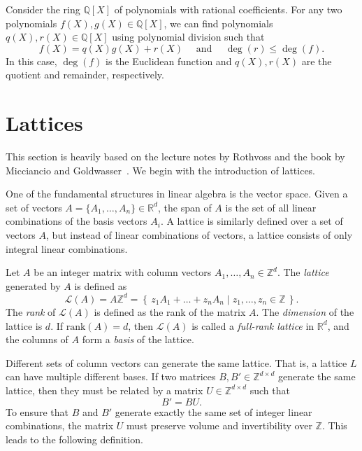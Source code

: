 \begin{example}
  Consider the ring $ℚ[X]$ of polynomials with rational coefficients.
  For any two polynomials $f(X), g(X) ∈ ℚ[X]$,
  we can find polynomials $q(X), r(X) ∈ ℚ[X]$
  using polynomial division such that
  \[
    f(X) = q(X) g(X) + r(X)
    \quad
    \text{ and }
    \quad
    \deg(r) ≤ \deg(f).
  \]
  In this case, $\deg(f)$ is the Euclidean function and $q(X), r(X)$ are
  the quotient and remainder, respectively.
\end{example}

\section{Lattices}

This section is heavily based on the lecture notes by Rothvoss
\cite{Rothvoss23} and the book by Micciancio and Goldwasser~\cite{Micciancio02}.
We begin with the introduction of lattices.

One of the fundamental structures in linear algebra is the vector space.
Given a set of vectors $A = \{A_1, …, A_n\} ∈ ℝ^d$, the span of $A$ is the set
of all linear combinations of the basis vectors $A_i$.
A lattice is similarly defined over a set of vectors $A$, but instead of linear
combinations of vectors, a lattice consists of only integral linear
combinations.

\begin{definition}
  Let $A$ be an integer matrix with column vectors $A_1, \dots, A_n ∈ ℤ^d$.
  The \emph{lattice} generated by $A$ is defined as
  \[
    \mathcal{L}(A) = A ℤ^d
    = \left\{\, z_1 A_1 + \dots + z_n A_n \mid z_1, \dots, z_n \in ℤ \,\right\}.
  \]
  The \emph{rank} of $\mathcal{L}(A)$ is defined as the rank of the matrix $A$.
  The \emph{dimension} of the lattice is $d$.
  If $\mathrm{rank}(A) = d$,
  then $\mathcal{L}(A)$ is called a \emph{full-rank lattice} in $ℝ^d$,
  and the columns of $A$ form a \emph{basis} of the lattice.
\end{definition}

Different sets of column vectors can generate the same lattice.
That is, a lattice $L$ can have multiple different bases.
If two matrices $B, B' \in \mathbb{Z}^{d \times d}$ generate the same lattice,
then they must be related by a matrix $U \in \mathbb{Z}^{d \times d}$
such that
\[
  B' = BU.
\]
To ensure that $B$ and $B'$ generate exactly the same set of integer linear combinations,
the matrix $U$ must preserve volume and invertibility over $ℤ$.
This leads to the following definition.

